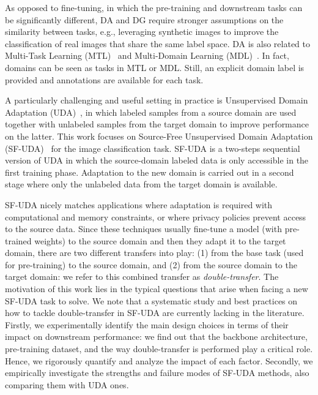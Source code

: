 \documentclass{article}
\begin{document}
As opposed to fine-tuning, in which the pre-training and downstream tasks can be significantly different, DA and DG require stronger assumptions on the similarity between tasks, e.g., leveraging synthetic images to improve the classification of real images that share the same label space.
DA is also related to Multi-Task Learning (MTL)~\citep{caruana1997multitask,ciliberto2017consistent} and Multi-Domain Learning (MDL)~\citep{joshi2012multi}. 
In fact, domains can be seen as tasks in MTL or MDL. Still, an explicit domain label is provided  and annotations are available for each task.

A particularly challenging and useful setting in practice is Unsupervised Domain Adaptation 
(UDA)~\citep{tzeng2017adversarial, ganin2016domain}, in which labeled samples from a source domain are used together with unlabeled samples from the target domain to improve performance on the latter.
This work focuses on Source-Free Unsupervised Domain Adaptation (SF-UDA)~\citep{liang2020we} for the image classification task. SF-UDA is a two-steps sequential version of UDA in which the source-domain labeled data is only accessible in the first training phase. 
Adaptation to the new domain is carried out in a second stage where only the unlabeled data from the target domain is available. 

SF-UDA nicely matches applications where adaptation is required with computational and memory constraints, 
or where privacy policies prevent access to the source data. 
Since these techniques usually fine-tune a model (with pre-trained weights) to the source domain and then they adapt it to the target domain, there are two different transfers into play: (1) from the base task (used for pre-training) to the source domain, and (2) from the source domain to the target domain: we refer to this combined transfer as \textit{double-transfer}.
The motivation of this work lies in the typical questions that arise when facing a new SF-UDA task to solve. 
We note that a systematic study and best practices on how to tackle double-transfer in SF-UDA are currently lacking in the literature.
Firstly, we experimentally identify the main design choices in terms of their impact on downstream performance: we find out that the backbone architecture, pre-training dataset, and the way double-transfer is performed play a critical role. 
Hence, we rigorously quantify and analyze the impact of each factor.
Secondly, we empirically investigate the strengths and failure modes of SF-UDA methods, also comparing them with UDA ones.
\end{document}

